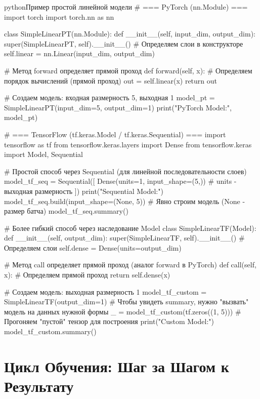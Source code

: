 \begin{codebox}{python}{Пример простой линейной модели}
# === PyTorch (nn.Module) ===
import torch
import torch.nn as nn

class SimpleLinearPT(nn.Module):
    def __init__(self, input_dim, output_dim):
        super(SimpleLinearPT, self).__init__()
        # Определяем слои в конструкторе
        self.linear = nn.Linear(input_dim, output_dim)

    # Метод forward определяет прямой проход
    def forward(self, x):
        # Определяем порядок вычислений (прямой проход)
        out = self.linear(x)
        return out

# Создаем модель: входная размерность 5, выходная 1
model_pt = SimpleLinearPT(input_dim=5, output_dim=1)
print("PyTorch Model:", model_pt)

# === TensorFlow (tf.keras.Model / tf.keras.Sequential) ===
import tensorflow as tf
from tensorflow.keras.layers import Dense
from tensorflow.keras import Model, Sequential

# Простой способ через Sequential (для линейной последовательности слоев)
model_tf_seq = Sequential([
    Dense(units=1, input_shape=(5,)) # units - выходная размерность
])
print("\nTensorFlow Sequential Model:")
model_tf_seq.build(input_shape=(None, 5)) # Явно строим модель (None - размер батча)
model_tf_seq.summary()

# Более гибкий способ через наследование Model
class SimpleLinearTF(Model):
    def __init__(self, output_dim):
        super(SimpleLinearTF, self).__init__()
        # Определяем слои
        self.dense = Dense(units=output_dim)

    # Метод call определяет прямой проход (аналог forward в PyTorch)
    def call(self, x):
        # Определяем прямой проход
        return self.dense(x)

# Создаем модель: выходная размерность 1
model_tf_custom = SimpleLinearTF(output_dim=1)
# Чтобы увидеть summary, нужно "вызвать" модель на данных нужной формы
_ = model_tf_custom(tf.zeros((1, 5))) # Прогоняем "пустой" тензор для построения
print("\nTensorFlow Custom Model:")
model_tf_custom.summary()
\end{codebox}

\section{Цикл Обучения: Шаг за Шагом к Результату}

